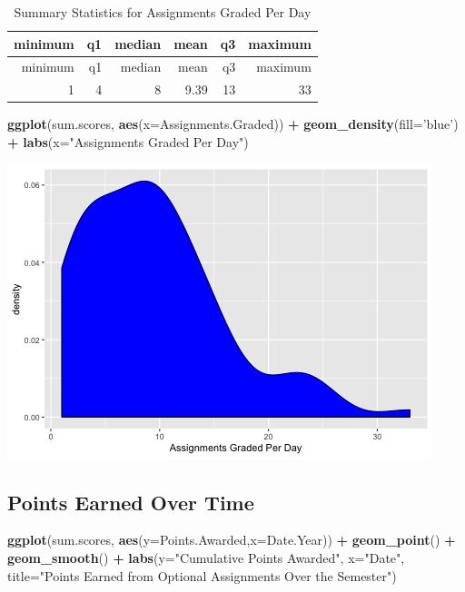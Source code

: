 \documentclass[]{article}
\newenvironment{Shaded}{\begin{snugshade}}{\end{snugshade}}
\newcommand{\KeywordTok}[1]{\textcolor[rgb]{0.13,0.29,0.53}{\textbf{#1}}}
\newcommand{\DataTypeTok}[1]{\textcolor[rgb]{0.13,0.29,0.53}{#1}}
\newcommand{\StringTok}[1]{\textcolor[rgb]{0.31,0.60,0.02}{#1}}
\newcommand{\OperatorTok}[1]{\textcolor[rgb]{0.81,0.36,0.00}{\textbf{#1}}}
\newcommand{\NormalTok}[1]{#1}
\begin{document}
\begin{longtable}[]{@{}rrrrrr@{}}
\caption{Summary Statistics for Assignments Graded Per
Day}\tabularnewline
\toprule
minimum & q1 & median & mean & q3 & maximum\tabularnewline
\midrule
\endfirsthead
\toprule
minimum & q1 & median & mean & q3 & maximum\tabularnewline
\midrule
\endhead
1 & 4 & 8 & 9.39 & 13 & 33\tabularnewline
\bottomrule
\end{longtable}

\begin{Shaded}
\begin{Highlighting}[]
\KeywordTok{ggplot}\NormalTok{(sum.scores, }\KeywordTok{aes}\NormalTok{(}\DataTypeTok{x=}\NormalTok{Assignments.Graded)) }\OperatorTok{+}
\StringTok{  }\KeywordTok{geom_density}\NormalTok{(}\DataTypeTok{fill=}\StringTok{'blue'}\NormalTok{) }\OperatorTok{+}
\StringTok{  }\KeywordTok{labs}\NormalTok{(}\DataTypeTok{x=}\StringTok{"Assignments Graded Per Day"}\NormalTok{)}
\end{Highlighting}
\end{Shaded}

\includegraphics{figures/assignments-graded-2.png}

\subsection{Points Earned Over Time}\label{points-earned-over-time}

\begin{Shaded}
\begin{Highlighting}[]
\KeywordTok{ggplot}\NormalTok{(sum.scores, }\KeywordTok{aes}\NormalTok{(}\DataTypeTok{y=}\NormalTok{Points.Awarded,}\DataTypeTok{x=}\NormalTok{Date.Year)) }\OperatorTok{+}
\StringTok{  }\KeywordTok{geom_point}\NormalTok{() }\OperatorTok{+}
\StringTok{  }\KeywordTok{geom_smooth}\NormalTok{() }\OperatorTok{+}
\StringTok{  }\KeywordTok{labs}\NormalTok{(}\DataTypeTok{y=}\StringTok{"Cumulative Points Awarded"}\NormalTok{,}
       \DataTypeTok{x=}\StringTok{"Date"}\NormalTok{,}
       \DataTypeTok{title=}\StringTok{"Points Earned from Optional Assignments Over the Semester"}\NormalTok{)}
\end{Highlighting}
\end{Shaded}
\end{document}
